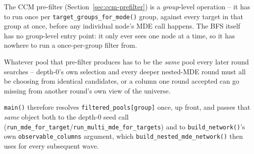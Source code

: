 \documentclass[11pt]{article}
\begin{document}
\begin{steps}
\item The CCM pre-filter (Section~\ref{sec:ccm-prefilter}) is a \emph{group}-level operation -- it has to run once per \texttt{target\_groups\_for\_mode()} group, against every target in that group at once, before any individual node's MDE call happens. The BFS itself has no group-level entry point: it only ever sees one node at a time, so it has nowhere to run a once-per-group filter from.
\item Whatever pool that pre-filter produces has to be the \emph{same} pool every later round searches -- depth-0's own selection and every deeper nested-MDE round must all be choosing from identical candidates, or a column one round accepted can go missing from another round's own view of the universe.
\item \texttt{main()} therefore resolves \texttt{filtered\_pools[group]} once, up front, and passes that \emph{same} object both to the depth-0 seed call (\texttt{run\_mde\_for\_target}/\texttt{run\_multi\_mde\_for\_targets}) and to \texttt{build\_network()}'s own \texttt{observable\_columns} argument, which \texttt{build\_nested\_mde\_network()} then uses for every subsequent wave.
\end{steps}
\end{document}
